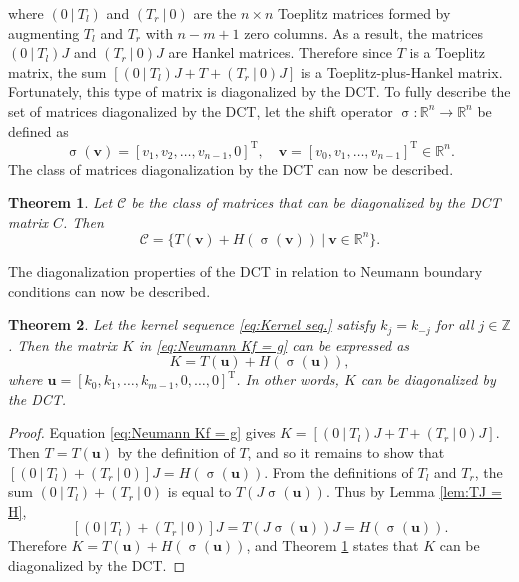 \documentclass[12pt]{book}
\newcommand{\trans}{\mathrm{T}}	%
\DeclareMathOperator{\shift}{\sigma}	%
\newtheorem{theorem}{Theorem}[section]
\begin{document}
where $(0~|~T_{l})$ and $(T_{r}~|~0)$ are the $n \times n$ Toeplitz matrices formed by augmenting $T_{l}$ and $T_{r}$ with $n-m+1$ zero columns. As a result, the matrices $(0~|~T_{l})J$ and $(T_{r}~|~0)J$ are Hankel matrices. Therefore since $T$ is a Toeplitz matrix, the sum $[(0~|~T_{l})J + T + (T_{r}~|~0)J]$ is a Toeplitz-plus-Hankel matrix. Fortunately, this type of matrix is diagonalized by the DCT. To fully describe the set of matrices diagonalized by the DCT, let the shift operator $\shift: \mathbb{R}^n \rightarrow \mathbb{R}^n$ be defined as
\[\shift(\mathbf{v}) = [v_1,v_2,\ldots,v_{n-1},0]^\trans, \quad \mathbf{v} = [v_0,v_1,\ldots,v_{n-1}]^\trans \in \mathbb{R}^n.\] 
The class of matrices diagonalization by the DCT can now be described.
\begin{theorem}
\label{thm:DCT Diagonalization}
Let $\mathcal{C}$ be the class of matrices that can be diagonalized by the DCT matrix $C$. Then
\[\mathcal{C} = \{T(\mathbf{v}) + H\left(\shift(\mathbf{v})\right) ~|~ \mathbf{v} \in \mathbb{R}^n\}.\]
\end{theorem}
The diagonalization properties of the DCT in relation to Neumann boundary conditions can now be described.
\begin{theorem}
\label{thm:Neumann Diagonalization}
Let the kernel sequence \eqref{eq:Kernel seq.} satisfy $k_j = k_{-j}$ for all $j \in \mathbb{Z}$. Then the matrix $K$ in \eqref{eq:Neumann Kf = g} can be expressed as
\[K = T(\mathbf{u}) + H\left(\shift(\mathbf{u})\right),\]
where $\mathbf{u} = [k_0,k_1,\ldots,k_{m-1},0,\ldots,0]^\trans$. In other words, $K$ can be diagonalized by the DCT.
\end{theorem}
\begin{proof}
Equation \eqref{eq:Neumann Kf = g} gives $K = [(0~|~T_{l})J + T + (T_{r}~|~0)J]$. Then $T = T(\mathbf{u})$ by the definition of $T$, and so it remains to show that $[(0~|~T_{l}) + (T_{r}~|~0)]J = H\left(\shift(\mathbf{u})\right)$. From the definitions of $T_{l}$ and $T_{r}$, the sum $(0~|~T_{l}) + (T_{r}~|~0)$ is equal to $T\left(J\shift(\mathbf{u})\right)$. Thus by Lemma \ref{lem:TJ = H},
\[[(0~|~T_{l}) + (T_{r}~|~0)]J = T\left(J\shift(\mathbf{u})\right)J = H\left(\shift(\mathbf{u})\right).\]
Therefore $K = T(\mathbf{u}) + H\left(\shift(\mathbf{u})\right)$, and Theorem \ref{thm:DCT Diagonalization} states that $K$ can be diagonalized by the DCT. 
\end{proof}
\end{document}
